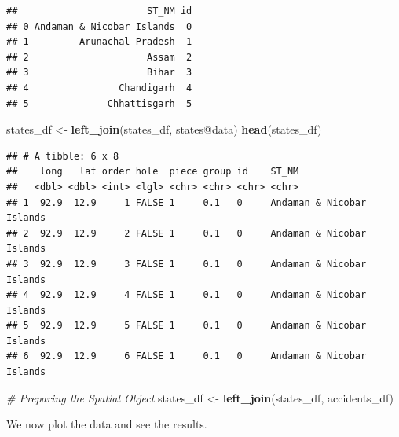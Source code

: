 \documentclass[]{article}
\newenvironment{Shaded}{}{}
\newcommand{\CommentTok}[1]{\textcolor[rgb]{0.38,0.63,0.69}{\textit{#1}}}
\newcommand{\KeywordTok}[1]{\textcolor[rgb]{0.00,0.44,0.13}{\textbf{#1}}}
\newcommand{\NormalTok}[1]{#1}
\newcommand{\OperatorTok}[1]{\textcolor[rgb]{0.40,0.40,0.40}{#1}}
\newcommand{\StringTok}[1]{\textcolor[rgb]{0.25,0.44,0.63}{#1}}
\begin{document}
\begin{verbatim}
##                       ST_NM id
## 0 Andaman & Nicobar Islands  0
## 1         Arunachal Pradesh  1
## 2                     Assam  2
## 3                     Bihar  3
## 4                Chandigarh  4
## 5              Chhattisgarh  5
\end{verbatim}

\begin{Shaded}
\begin{Highlighting}[]
\NormalTok{states_df <-}\StringTok{ }\KeywordTok{left_join}\NormalTok{(states_df, states}\OperatorTok{@}\NormalTok{data)}
\KeywordTok{head}\NormalTok{(states_df)}
\end{Highlighting}
\end{Shaded}

\begin{verbatim}
## # A tibble: 6 x 8
##    long   lat order hole  piece group id    ST_NM                    
##   <dbl> <dbl> <int> <lgl> <chr> <chr> <chr> <chr>                    
## 1  92.9  12.9     1 FALSE 1     0.1   0     Andaman & Nicobar Islands
## 2  92.9  12.9     2 FALSE 1     0.1   0     Andaman & Nicobar Islands
## 3  92.9  12.9     3 FALSE 1     0.1   0     Andaman & Nicobar Islands
## 4  92.9  12.9     4 FALSE 1     0.1   0     Andaman & Nicobar Islands
## 5  92.9  12.9     5 FALSE 1     0.1   0     Andaman & Nicobar Islands
## 6  92.9  12.9     6 FALSE 1     0.1   0     Andaman & Nicobar Islands
\end{verbatim}

\begin{Shaded}
\begin{Highlighting}[]
\CommentTok{# Preparing the Spatial Object}
\NormalTok{states_df <-}\StringTok{ }\KeywordTok{left_join}\NormalTok{(states_df, accidents_df)}
\end{Highlighting}
\end{Shaded}

We now plot the data and see the results.
\end{document}
